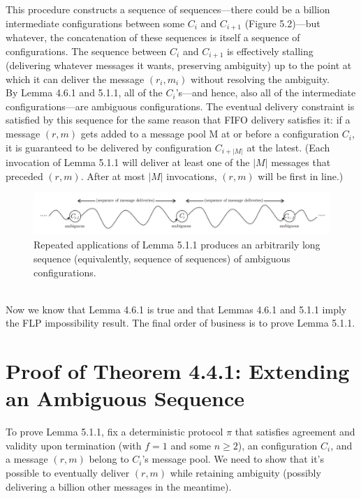 This procedure constructs a sequence of sequences—there could be a billion intermediate
configurations between some $C_i$ and $C_{i+1}$ (Figure 5.2)—but whatever, the concatenation of
these sequences is itself a sequence of configurations. The sequence between $C_i$ and $C_{i+1}$ is
effectively stalling (delivering whatever messages it wants, preserving ambiguity) up to the
point at which it can deliver the message $(r_i, m_i)$ without resolving the ambiguity.\\
By Lemma 4.6.1 and 5.1.1, all of the $C_i$’s—and hence, also all of the intermediate configurations—are ambiguous configurations. The eventual delivery constraint is satisfied by this sequence for the same reason that FIFO delivery satisfies it: if a message $(r, m)$ gets added to a message pool M at or before a configuration $C_i$, it is guaranteed to be delivered by configuration $C_{i+|M|}$ at the latest. (Each invocation of Lemma 5.1.1 will
deliver at least one of the $|M|$ messages that preceded $(r, m)$. After at most $|M|$ invocations,
$(r, m)$ will be first in line.)\\
\begin{figure}[h]
    \centering
    \includegraphics[scale = 0.5]{figures/f17.png}
    \caption{Repeated applications of Lemma 5.1.1 produces an arbitrarily long sequence (equivalently, sequence of sequences) of ambiguous configurations.}
    \label{fig:mesh1}
\end{figure}\\
Now we know that Lemma 4.6.1 is true and that Lemmas 4.6.1 and 5.1.1 imply the FLP impossibility result. The final order of business is to prove Lemma 5.1.1.
\newpage
\section{Proof of Theorem 4.4.1: Extending an Ambiguous Sequence}
To prove Lemma 5.1.1, fix a deterministic protocol $\pi$ that satisfies agreement and validity
upon termination (with $f = 1$ and some $n \geq 2$), an configuration $C_i$, and a message $(r, m)$
belong to $C_i$’s message pool. We need to show that it’s possible to eventually deliver $(r, m)$
while retaining ambiguity (possibly delivering a billion other messages in the meantime).

